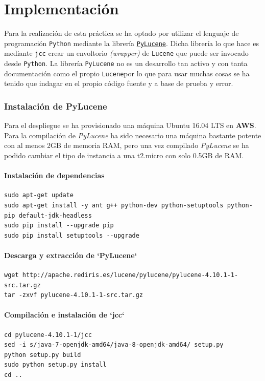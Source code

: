 \chapter{Implementación}

Para la realización de esta práctica se ha optado por utilizar el
lenguaje de programación \texttt{Python} mediante la librería
\href{http://lucene.apache.org/pylucene/}{\texttt{PyLucene}}. Dicha
librería lo que hace es mediante \texttt{jcc} crear un envoltorio
\emph{(wrapper)} de \texttt{Lucene} que puede ser invocado desde
\texttt{Python}. La librería \texttt{PyLucene} no es un desarrollo tan
activo y con tanta documentación como el propio \texttt{Lucene}por lo
que para usar muchas cosas se ha tenido que indagar en el propio código
fuente y a base de prueba y error.


\subsection{Instalación de PyLucene}

Para el despliegue se ha provisionado una máquina Ubuntu 16.04 LTS en \textbf{AWS}. Para la compilación de \textit{PyLucene} ha sido necesario una máquina bastante potente con al menos 2GB de memoria RAM, pero una vez compilado \textit{PyLucene} se ha podido cambiar el tipo de instancia a una t2.micro con solo 0.5GB de RAM.

\subsubsection{Instalación de dependencias}
\begin{lstlisting}
sudo apt-get update
sudo apt-get install -y ant g++ python-dev python-setuptools python-pip default-jdk-headless
sudo pip install --upgrade pip
sudo pip install setuptools --upgrade
\end{lstlisting}

\subsubsection{Descarga y extracción de `PyLucene`}
\begin{lstlisting}
wget http://apache.rediris.es/lucene/pylucene/pylucene-4.10.1-1-src.tar.gz
tar -zxvf pylucene-4.10.1-1-src.tar.gz
\end{lstlisting}

\subsubsection{Compilación e instalación de `jcc`}
\begin{lstlisting}
cd pylucene-4.10.1-1/jcc
sed -i s/java-7-openjdk-amd64/java-8-openjdk-amd64/ setup.py
python setup.py build
sudo python setup.py install
cd ..
\end{lstlisting}

